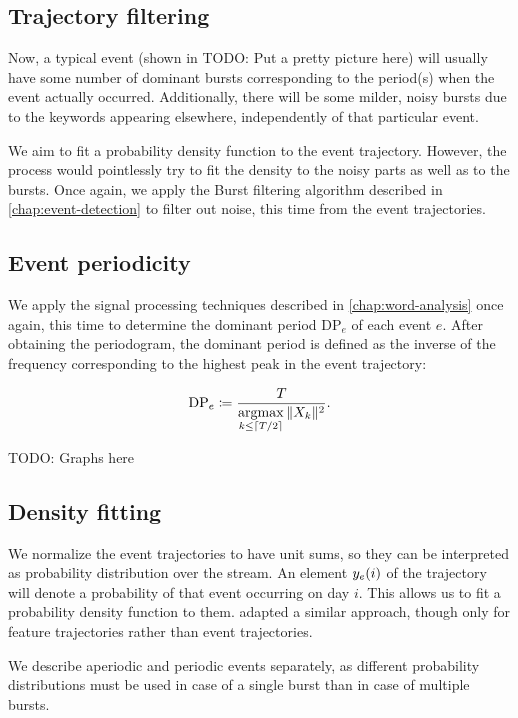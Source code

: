 \subsection{Trajectory filtering}

Now, a typical event (shown in {\color{red} TODO: Put a pretty picture here}) will usually have some number of dominant bursts corresponding to the period(s) when the event actually occurred. Additionally, there will be some milder, noisy bursts due to the keywords appearing elsewhere, independently of that particular event.

We aim to fit a probability density function to the event trajectory. However, the process would pointlessly try to fit the density to the noisy parts as well as to the bursts. Once again, we apply the Burst filtering algorithm described in \autoref{chap:event-detection} to filter out noise, this time from the event trajectories.

\subsection{Event periodicity}
We apply the signal processing techniques described in \autoref{chap:word-analysis} once again, this time to determine the dominant period $\text{DP}_{e}$ of each event $e$. After obtaining the periodogram, the dominant period is defined as the inverse of the frequency corresponding to the highest peak in the event trajectory:

\begin{equation}
	\text{DP}_{e} \coloneqq \frac{T}{\operatorname*{argmax}\limits_{k \leq \lceil T / 2\rceil}{\|X_{k}\|^{2}}}.
\end{equation}

{\color{red} TODO: Graphs here}

\subsection{Density fitting}
We normalize the event trajectories to have unit sums, so they can be interpreted as probability distribution over the stream. An element $y_{e}(i)$ of the trajectory will denote a probability of that event occurring on day $i$. This allows us to fit a probability density function to them. \cite{event-detection} adapted a similar approach, though only for feature trajectories rather than event trajectories.

We describe aperiodic and periodic events separately, as different probability distributions must be used in case of a single burst than in case of multiple bursts.

